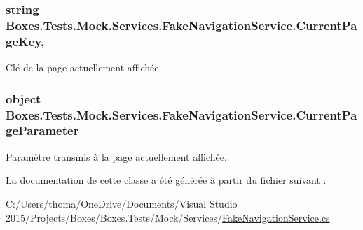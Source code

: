 \subsubsection[{\texorpdfstring{Current\+Page\+Key}{CurrentPageKey}}]{\setlength{\rightskip}{0pt plus 5cm}string Boxes.\+Tests.\+Mock.\+Services.\+Fake\+Navigation\+Service.\+Current\+Page\+Key\hspace{0.3cm}{\ttfamily [get]}, {}}\hypertarget{class_boxes_1_1_tests_1_1_mock_1_1_services_1_1_fake_navigation_service_ac56e00a3392fc0d8370e34f2b3665021}{}\label{class_boxes_1_1_tests_1_1_mock_1_1_services_1_1_fake_navigation_service_ac56e00a3392fc0d8370e34f2b3665021}


Clé de la page actuellement affichée. 

\subsubsection[{\texorpdfstring{Current\+Page\+Parameter}{CurrentPageParameter}}]{\setlength{\rightskip}{0pt plus 5cm}object Boxes.\+Tests.\+Mock.\+Services.\+Fake\+Navigation\+Service.\+Current\+Page\+Parameter\hspace{0.3cm}{\ttfamily [get]}}\hypertarget{class_boxes_1_1_tests_1_1_mock_1_1_services_1_1_fake_navigation_service_a6a5a1f38263717cf9dbfada81deb79d3}{}\label{class_boxes_1_1_tests_1_1_mock_1_1_services_1_1_fake_navigation_service_a6a5a1f38263717cf9dbfada81deb79d3}


Paramètre transmis à la page actuellement affichée. 



La documentation de cette classe a été générée à partir du fichier suivant \+:\begin{DoxyCompactItemize}
\item 
C\+:/\+Users/thoma/\+One\+Drive/\+Documents/\+Visual Studio 2015/\+Projects/\+Boxes/\+Boxes.\+Tests/\+Mock/\+Services/\hyperlink{_fake_navigation_service_8cs}{Fake\+Navigation\+Service.\+cs}\end{DoxyCompactItemize}
